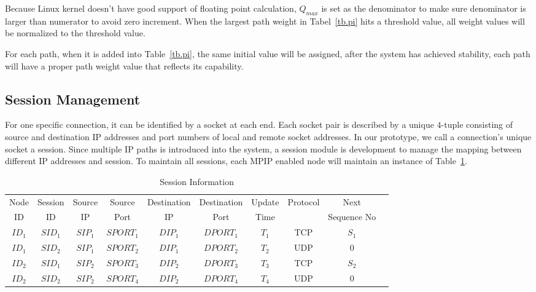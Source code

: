 Because Linux kernel doesn\textquoteright t have good support of floating point calculation, $Q_{max}$ is set as the denominator to make sure denominator is larger than numerator to avoid zero increment. When the largest path weight in Tabel~\ref{tb.pi} hits a threshold value, all weight values will be normalized to the threshold value.

For each path, when it is added into Table~\ref{tb.pi}, the same initial value will be assigned, after the system has achieved stability, each path will have a proper path weight value that reflects its capability. 

%


\subsection{Session Management}
\label{sec:session}

For one specific connection, it can be identified by a socket at each end.  Each socket pair is described by a unique $4$-tuple consisting of source and destination IP addresses and port numbers of local and remote socket addresses. In our prototype, we call a connection\textquoteright s unique socket a session. Since multiple IP paths is introduced into the system, a session module is development to manage the mapping between different IP addresses and session. To maintain all sessions, each MPIP enabled node will maintain an instance of Table~\ref{tb.ss}.

\begin{table}
\caption{\label{tb.ss}Session Information}
\centering
\begin{tabular}{|c|c|c|c|c|c|c|c|c|c|}
\hline
Node  & Session &  Source &  Source & Destination & Destination & Update  & Protocol  &    Next      \\
  ID  &   ID    &    IP   &   Port  &     IP      &    Port     &  Time   &           &  Sequence No \\
\hline
${ID}_1$&${SID}_1$&${SIP}_{1}$&${SPORT}_{1}$&${DIP}_{1}$&${DPORT}_{1}$&$T_1$&TCP&$S_1$               \\
\hline
${ID}_1$&${SID}_2$&${SIP}_{1}$&${SPORT}_{2}$&${DIP}_{1}$&${DPORT}_{2}$&$T_2$&UDP&$0$                 \\
\hline
${ID}_2$&${SID}_1$&${SIP}_{2}$&${SPORT}_{3}$&${DIP}_{2}$&${DPORT}_{3}$&$T_3$&TCP&$S_2$              \\
\hline
${ID}_2$&${SID}_2$&${SIP}_{2}$&${SPORT}_{4}$&${DIP}_{2}$&${DPORT}_{4}$&$T_4$&UDP&$0$                 \\
\hline
\end{tabular}
\end{table}


